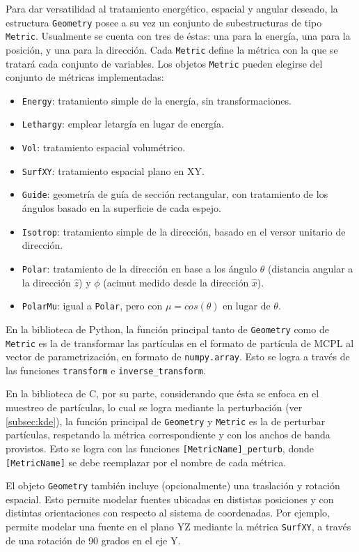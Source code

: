 Para dar versatilidad al tratamiento energético, espacial y angular deseado, la estructura \verb|Geometry| posee a su vez un conjunto de subestructuras de tipo \verb|Metric|. Usualmente se cuenta con tres de éstas: una para la energía, una para la posición, y una para la dirección. Cada \verb|Metric| define la métrica con la que se tratará cada conjunto de variables. Los objetos \verb|Metric| pueden elegirse del conjunto de métricas implementadas:
\begin{itemize}
	\item \verb|Energy|: tratamiento simple de la energía, sin transformaciones.
	\item \verb|Lethargy|: emplear letargía en lugar de energía.
	\item \verb|Vol|: tratamiento espacial volumétrico.
	\item \verb|SurfXY|: tratamiento espacial plano en XY.
	\item \verb|Guide|: geometría de guía de sección rectangular, con tratamiento de los ángulos basado en la superficie de cada espejo.
	\item \verb|Isotrop|: tratamiento simple de la dirección, basado en el versor unitario de dirección.
	\item \verb|Polar|: tratamiento de la dirección en base a los ángulo $\theta$ (distancia angular a la dirección $\hat{z}$) y $\phi$ (acimut medido desde la dirección $\hat{x}$).
	\item \verb|PolarMu|: igual a \verb|Polar|, pero con $\mu = cos(\theta)$ en lugar de $\theta$.
\end{itemize}

En la biblioteca de Python, la función principal tanto de \verb|Geometry| como de \verb|Metric| es la de transformar las partículas en el formato de partícula de MCPL al vector de parametrización, en formato de \verb|numpy.array|. Esto se logra a través de las funciones \verb|transform| e \verb|inverse_transform|.

En la biblioteca de C, por su parte, considerando que ésta se enfoca en el muestreo de partículas, lo cual se logra mediante la perturbación (ver \ref{subsec:kde}), la función principal de \verb|Geometry| y \verb|Metric| es la de perturbar partículas, respetando la métrica correspondiente y con los anchos de banda provistos. Esto se logra con las funciones \verb|[MetricName]_perturb|, donde \verb|[MetricName]| se debe reemplazar por el nombre de cada métrica.

El objeto \verb|Geometry| también incluye (opcionalmente) una traslación y rotación espacial. Esto permite modelar fuentes ubicadas en dististas posiciones y con distintas orientaciones con respecto al sistema de coordenadas. Por ejemplo, permite modelar una fuente en el plano YZ mediante la métrica \verb|SurfXY|, a través de una rotación de 90 grados en el eje Y. 

